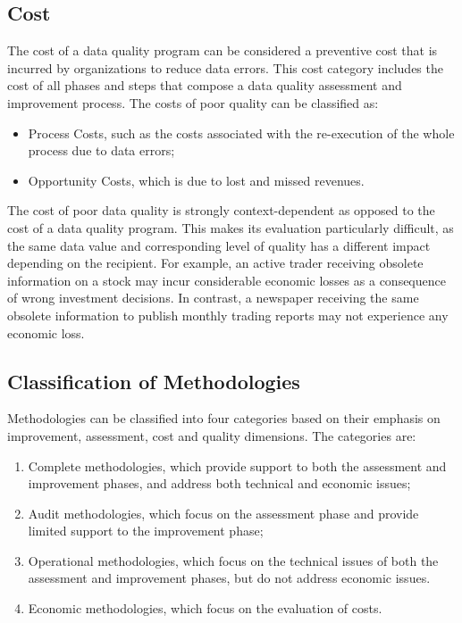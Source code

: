\documentclass[pdftex,english,oribibl]{llncs}
\begin{document}
\subsection{Cost}
The cost of a data quality program can be considered a preventive cost that is incurred by organizations to reduce data errors. This cost category includes the cost of all phases and steps that compose a data quality assessment and improvement process. \cite{Batini2009MethodologiesForDataQuality}
The costs of poor quality can be classified as:
\begin{itemize}
    \item Process Costs, such as the costs associated with the re-execution of the whole process due to data errors;
    \item Opportunity Costs, which is due to lost and missed revenues.
\end{itemize}
 The cost of poor data quality is strongly context-dependent as opposed to the cost of a data quality program. This makes its evaluation particularly difficult, as the same data value and corresponding level of quality has a different impact depending on the recipient. For example, an active trader receiving obsolete information on a stock may incur considerable economic losses as a consequence of wrong investment decisions. In contrast, a newspaper receiving the same obsolete information to publish monthly trading reports may not experience any economic loss.

\subsection{Classification of Methodologies}
Methodologies can be classified into four categories based on their emphasis on improvement, assessment, cost and quality dimensions. \cite{Batini2009MethodologiesForDataQuality}  The categories are:
\begin{enumerate}
    \item Complete methodologies, which provide support to both the assessment and improvement phases, and address both technical and economic issues;
    \item Audit methodologies, which focus on the assessment phase and provide limited support to the improvement phase;
    \item Operational methodologies, which focus on the technical issues of both the assessment and improvement phases, but do not address economic issues.
    \item Economic methodologies, which focus on the evaluation of costs.
\end{enumerate}
\end{document}
